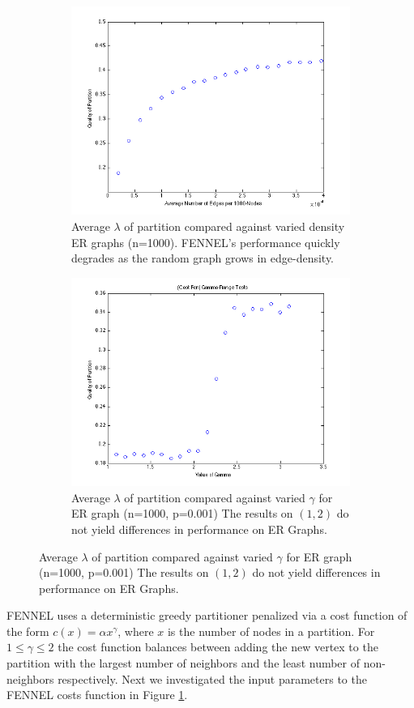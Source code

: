 \documentclass[11pt]{article}
\begin{document}
\begin{figure}[ht]
\caption{FENNEL experiments investigating partition quality versus graph density and parameter choice.} 
\begin{subfigure}[b]{0.5\textwidth}
\caption{Average $\lambda$ of partition compared against varied density ER graphs (n=1000).  FENNEL's performance quickly degrades as the random graph grows in edge-density.}
\label{figure:quality}
\centering
\includegraphics[width=\textwidth] {figures/varied_er_p.png}
\end{subfigure}
\begin{subfigure}[b]{0.5\textwidth}
\caption{Average $\lambda$ of partition compared against varied $\gamma$ for ER graph (n=1000, p=0.001)  The results on $(1,2)$ do not yield differences in performance on ER Graphs.}
\label{figure:gamma}
\includegraphics[width=\textwidth] {figures/varied_gamma.png}
\end{subfigure}
\end{figure}
FENNEL uses a deterministic greedy partitioner penalized via a cost function of the form $c(x) = \alpha x^\gamma$, where $x$ is the number of nodes in a partition. 
For $1\le\gamma\le 2$ the cost function balances between adding the new vertex to the partition with the largest number of neighbors and the least number of non-neighbors respectively.
Next we investigated the input parameters to the FENNEL costs function in Figure \ref{figure:quality}.  
\end{document}
